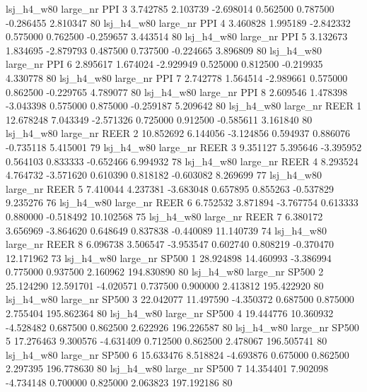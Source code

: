   lsj_h4_w80   large_nr      PPI                 3  3.742785  2.103739  -2.698014 0.562500 0.787500 -0.286455    2.810347 80
  lsj_h4_w80   large_nr      PPI                 4  3.460828  1.995189  -2.842332 0.575000 0.762500 -0.259657    3.443514 80
  lsj_h4_w80   large_nr      PPI                 5  3.132673  1.834695  -2.879793 0.487500 0.737500 -0.224665    3.896809 80
  lsj_h4_w80   large_nr      PPI                 6  2.895617  1.674024  -2.929949 0.525000 0.812500 -0.219935    4.330778 80
  lsj_h4_w80   large_nr      PPI                 7  2.742778  1.564514  -2.989661 0.575000 0.862500 -0.229765    4.789077 80
  lsj_h4_w80   large_nr      PPI                 8  2.609546  1.478398  -3.043398 0.575000 0.875000 -0.259187    5.209642 80
  lsj_h4_w80   large_nr     REER                 1 12.678248  7.043349  -2.571326 0.725000 0.912500 -0.585611    3.161840 80
  lsj_h4_w80   large_nr     REER                 2 10.852692  6.144056  -3.124856 0.594937 0.886076 -0.735118    5.415001 79
  lsj_h4_w80   large_nr     REER                 3  9.351127  5.395646  -3.395952 0.564103 0.833333 -0.652466    6.994932 78
  lsj_h4_w80   large_nr     REER                 4  8.293524  4.764732  -3.571620 0.610390 0.818182 -0.603082    8.269699 77
  lsj_h4_w80   large_nr     REER                 5  7.410044  4.237381  -3.683048 0.657895 0.855263 -0.537829    9.235276 76
  lsj_h4_w80   large_nr     REER                 6  6.752532  3.871894  -3.767754 0.613333 0.880000 -0.518492   10.102568 75
  lsj_h4_w80   large_nr     REER                 7  6.380172  3.656969  -3.864620 0.648649 0.837838 -0.440089   11.140739 74
  lsj_h4_w80   large_nr     REER                 8  6.096738  3.506547  -3.953547 0.602740 0.808219 -0.370470   12.171962 73
  lsj_h4_w80   large_nr    SP500                 1 28.924898 14.460993  -3.386994 0.775000 0.937500  2.160962  194.830890 80
  lsj_h4_w80   large_nr    SP500                 2 25.124290 12.591701  -4.020571 0.737500 0.900000  2.413812  195.422920 80
  lsj_h4_w80   large_nr    SP500                 3 22.042077 11.497590  -4.350372 0.687500 0.875000  2.755404  195.862364 80
  lsj_h4_w80   large_nr    SP500                 4 19.444776 10.360932  -4.528482 0.687500 0.862500  2.622926  196.226587 80
  lsj_h4_w80   large_nr    SP500                 5 17.276463  9.300576  -4.631409 0.712500 0.862500  2.478067  196.505741 80
  lsj_h4_w80   large_nr    SP500                 6 15.633476  8.518824  -4.693876 0.675000 0.862500  2.297395  196.778630 80
  lsj_h4_w80   large_nr    SP500                 7 14.354401  7.902098  -4.734148 0.700000 0.825000  2.063823  197.192186 80
